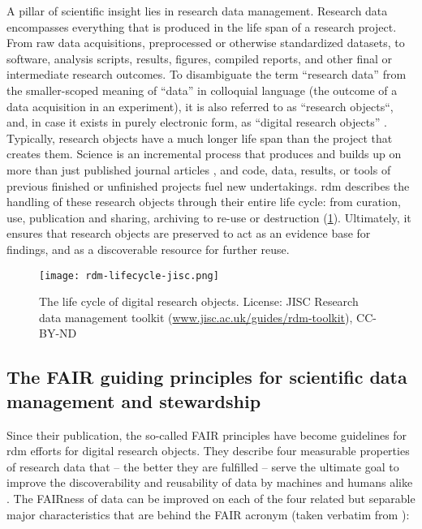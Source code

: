 A pillar of scientific insight lies in research data management.
Research data encompasses everything that is produced in the life span of a research project.
From raw data acquisitions, preprocessed or otherwise standardized datasets, to software, analysis scripts, results, figures, compiled reports, and other final or intermediate research outcomes.
To disambiguate the term ``research data'' from the smaller-scoped meaning of ``data'' in colloquial language (the outcome of a data acquisition in an experiment), it is also referred to as ``research objects``, and, in case it exists in purely electronic form, as ``digital research objects'' \citep{bechhofer2010research}. \\
Typically, research objects have a much longer life span than the project that creates them.
Science is an incremental process that produces and builds up on more than just published journal articles \citep{mons2018data}, and code, data, results, or tools of previous finished or unfinished projects fuel new undertakings.
\gls{rdm} describes the handling of these research objects through their entire life cycle: from curation, use, publication and sharing, archiving to re-use or destruction (\cref{fig:rdm-lifecycle}).
Ultimately, it ensures that research objects are preserved to act as an evidence base for findings, and as a discoverable resource for further reuse.


\begin{figure}
	\centering
	\texttt{[image: rdm-lifecycle-jisc.png]}
	\caption[The life cycle of digital research objects]{The life cycle of digital research objects. License: JISC Research data management toolkit (\href{https://www.jisc.ac.uk/guides/rdm-toolkit}{www.jisc.ac.uk/guides/rdm-toolkit}), CC-BY-ND}
	\label{fig:rdm-lifecycle}
\end{figure}


\subsection{The FAIR guiding principles for scientific data management and stewardship}

Since their publication, the so-called \gls{FAIR} principles \citep{wilkinson2016fair} have become guidelines for \gls{rdm} efforts for digital research objects.
They describe four measurable properties of research data that -- the better they are fulfilled -- serve the ultimate goal to improve the discoverability and reusability of data by machines and humans alike \citep{wilkinson2016fair}.
The \gls{FAIR}ness of data can be improved on each of the four related but separable major characteristics that are behind the \gls{FAIR} acronym (taken verbatim from \citet{wilkinson2016fair}):

